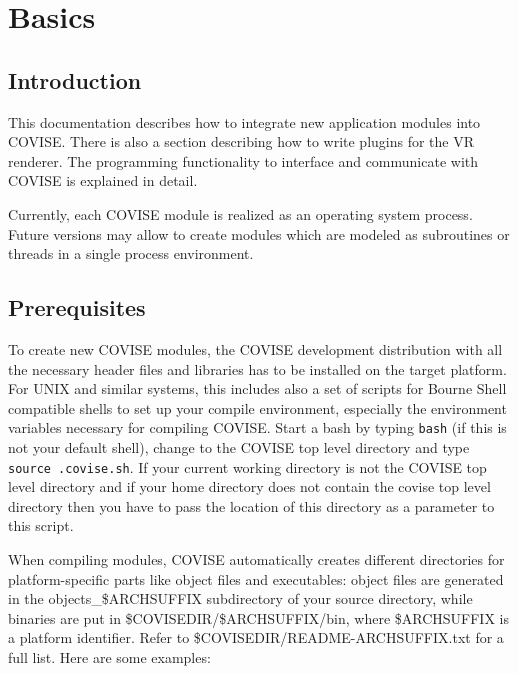 
\begin{htmlonly}

\end{htmlonly}



\startdocument
\chapter{Basics}
\label{Basics}


\section{Introduction}

This documentation describes how to integrate new application modules into COVISE.
There is also a section describing how to write plugins for the VR renderer.
The programming functionality to interface and communicate with COVISE is explained 
in detail.

Currently, each COVISE module is realized as an operating system process.
Future versions may allow to create modules which are modeled as subroutines or
threads in a single process environment.

\section{Prerequisites}
\latexonly
{}
\endlatexonly

To create new COVISE modules, the COVISE development distribution with all the 
necessary header files and libraries has to be installed on the target platform. 
For UNIX and similar systems, this includes also a set of scripts for Bourne
Shell compatible shells
to set up your compile environment, especially the environment variables necessary
for compiling COVISE.
Start a bash by typing \texttt{bash} (if this is not your default shell), change to the
COVISE top level directory and type \texttt{source .covise.sh}.
If your current working directory is not the COVISE top level directory
and if your home directory does not contain the covise top level directory then you have to pass the
location of this directory as a parameter to this script.

When compiling modules, COVISE automatically creates different directories for 
platform-specific parts like object files and executables: object files are generated 
in the objects\_\$ARCHSUFFIX subdirectory of your source directory, while binaries are put in 
\$COVISEDIR/\$ARCHSUFFIX/bin, where \$ARCHSUFFIX is a platform identifier. Refer to
\$COVISEDIR/README-ARCHSUFFIX.txt for a full list. Here are some examples:

